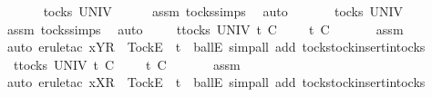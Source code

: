 \ \ \isamarkupfalse%
\ {}{\isacharcolon}\ {\isachardoublequoteopen}{\isasymsigma}{\isacharprime}{\isacharprime}\ {\isasymin}\ tocks\ UNIV{\isachardoublequoteclose}\isanewline
\ \ \ \ \isamarkupfalse%
\ assm{}\ tocks{\isachardot}simps\ \isamarkupfalse%
\ auto\isanewline
\ \ \isamarkupfalse%
\ {}{\isacharcolon}\ {\isachardoublequoteopen}{\isasymrho}\ {\isasymin}\ tocks\ UNIV{\isachardoublequoteclose}\isanewline
\ \ \ \ \isamarkupfalse%
\ assm{}\ tocks{\isachardot}simps\ \isamarkupfalse%
\ auto\isanewline
\ \ \isamarkupfalse%
\ {}{\isacharcolon}\ {\isachardoublequoteopen}{\isasymforall}t{\isasymin}tocks\ UNIV{\isachardot}\ t\ {\isasymle}\isactrlsub C\ {\isasymsigma}{\isacharprime}{\isacharprime}\ {\isacharat}\ {\isasymsigma}\ {\isasymlongrightarrow}\ t\ {\isasymle}\isactrlsub C\ {\isasymsigma}{\isacharprime}{\isacharprime}{\isachardoublequoteclose}\isanewline
\ \ \ \ \isamarkupfalse%
\ assm{}\ \isamarkupfalse%
\ {\isacharparenleft}auto{\isacharcomma}\ erule{\isacharunderscore}tac\ x{\isacharequal}{\isachardoublequoteopen}{\isacharbrackleft}Y{\isacharbrackright}\isactrlsub R\ {\isacharhash}\ {\isacharbrackleft}Tock{\isacharbrackright}\isactrlsub E\ {\isacharhash}\ t{\isachardoublequoteclose}\ \ ballE{\isacharcomma}\ simp{\isacharunderscore}all\ add{\isacharcolon}\ tocks{\isachardot}tock{\isacharunderscore}insert{\isacharunderscore}in{\isacharunderscore}tocks{\isacharparenright}\isanewline
\ \ \isamarkupfalse%
\ {}{\isacharcolon}\ {\isachardoublequoteopen}{\isasymforall}t{\isasymin}tocks\ UNIV{\isachardot}\ t\ {\isasymle}\isactrlsub C\ {\isasymrho}\ {\isacharat}\ {\isasymsigma}{\isacharprime}\ {\isasymlongrightarrow}\ t\ {\isasymle}\isactrlsub C\ {\isasymrho}{\isachardoublequoteclose}\isanewline
\ \ \ \ \isamarkupfalse%
\ assm{}\ \isamarkupfalse%
\ {\isacharparenleft}auto{\isacharcomma}\ erule{\isacharunderscore}tac\ x{\isacharequal}{\isachardoublequoteopen}{\isacharbrackleft}X{\isacharbrackright}\isactrlsub R\ {\isacharhash}\ {\isacharbrackleft}Tock{\isacharbrackright}\isactrlsub E\ {\isacharhash}\ t{\isachardoublequoteclose}\ \ ballE{\isacharcomma}\ simp{\isacharunderscore}all\ add{\isacharcolon}\ tocks{\isachardot}tock{\isacharunderscore}insert{\isacharunderscore}in{\isacharunderscore}tocks{\isacharparenright}\isanewline
\ \ \isamarkupfalse%
